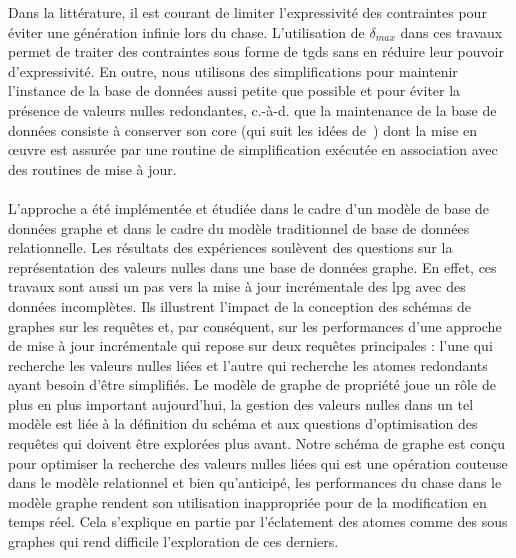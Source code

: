 Dans la littérature, il est courant de limiter l'expressivité des contraintes pour éviter une génération infinie lors du \gls{chase}.
L'utilisation de $\delta_{max}$ dans ces travaux permet de traiter des contraintes sous forme de \glspl{tgd} sans en réduire leur pouvoir d'expressivité.
En outre, nous utilisons des simplifications pour maintenir l'instance de la base de données aussi petite que possible et pour éviter la présence de valeurs nulles redondantes, c.-à-d. que la maintenance de la base de données consiste à conserver son \gls{core} (qui suit les idées de~\cite{faginDataExchangeGetting2005}) dont la mise en œuvre est assurée par une routine de simplification exécutée en association avec des routines de mise à jour.

\paragraph{}
L'approche a été implémentée et étudiée dans le cadre d'un modèle de base de données graphe et dans le cadre du modèle traditionnel de base de données relationnelle.
Les résultats des expériences soulèvent des questions sur la représentation des valeurs nulles dans une base de données graphe.
En effet, ces travaux sont aussi un pas vers la mise à jour incrémentale des \gls{lpg} avec des données incomplètes.
Ils illustrent l'impact de la conception des schémas de graphes sur les requêtes et, par conséquent, sur les performances d'une approche de mise à jour incrémentale qui repose sur deux requêtes principales : l'une qui recherche les valeurs nulles liées et l'autre qui recherche les atomes redondants ayant besoin d'être simplifiés.
Le modèle de graphe de propriété joue un rôle de plus en plus important aujourd'hui, la gestion des valeurs nulles dans un tel modèle est liée à la définition du schéma et aux questions d'optimisation des requêtes qui doivent être explorées plus avant.
Notre schéma de graphe est conçu pour optimiser la recherche des valeurs nulles liées qui est une opération couteuse dans le modèle relationnel et bien qu'anticipé, les performances du \gls{chase} dans le modèle graphe rendent son utilisation inappropriée pour de la modification en temps réel.
Cela s'explique en partie par l'éclatement des atomes comme des sous graphes qui rend difficile l'exploration de ces derniers.

